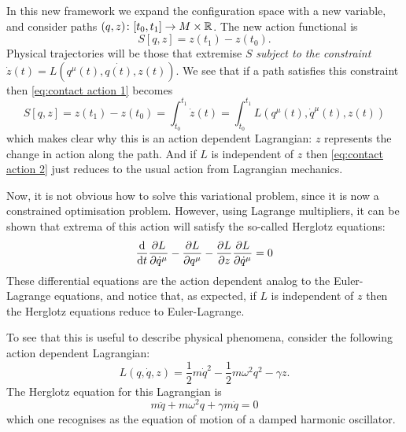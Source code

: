 \documentclass[../main.tex]{subfiles}
\begin{document}
In this new framework we expand the configuration space with a new variable, and consider
paths \( (q,z) \colon [t_0, t_1] \to M \times \mathbb{R} \). The new action functional is 
\begin{equation}\label{eq:contact action 1}
	S[q,z] = z(t_1) - z(t_0).
\end{equation}
Physical trajectories will be those that extremise \( S \) \emph{subject to the
constraint} \( \dot{z}(t) = L(q^\mu(t), \dot{q(t)}, z(t)) \). We see that if a path
satisfies this constraint then \cref{eq:contact action 1} becomes
\begin{equation}\label{eq:contact action 2}
	S[q,z] = z(t_1) - z(t_0) = \int_{t_0}^{t_1} \dot{z}(t) = \int_{t_0}^{t_1} L(q^\mu(t),
	\dot{q}^\mu(t), z(t))
\end{equation}
which makes clear why this is an action dependent Lagrangian: \( z \) represents the
change in action along the path. And if \( L \) is independent of \( z \) then
\cref{eq:contact action 2} just reduces to the usual action from Lagrangian mechanics. 

Now, it is not obvious how to solve this variational problem, since it is now a
constrained optimisation problem. However, using Lagrange multipliers, it can be shown
that extrema of this action will satisfy the so-called Herglotz equations:
\begin{equation}\label{eq:herglotz}
 	\frac{\mathrm{d}}{\mathrm{d} t}\frac{\partial L}{\partial \dot{q}^\mu} - \frac{\partial L}{\partial
 	q^\mu} - \frac{\partial L}{\partial z} \frac{\partial L}{\partial \dot{q}^\mu} = 0
\end{equation}
These differential equations are the action dependent analog to the Euler-Lagrange
equations, and notice that, as expected, if \( L \) is independent of \( z \) then the
Herglotz equations reduce to Euler-Lagrange. 

To see that this is useful to describe physical phenomena, consider the following action
dependent Lagrangian:
\begin{equation*}
	L(q, \dot{q}, z) = \frac{1}{2}m\dot{q}^2 - \frac{1}{2}m\omega^2 q^2 - \gamma z. 
\end{equation*}
The Herglotz equation for this Lagrangian is
\begin{equation*}
	m\ddot{q} + m\omega^2 q + \gamma m \dot{q} = 0  
\end{equation*}
which one recognises as the equation of motion of a damped harmonic oscillator. 
\end{document}
